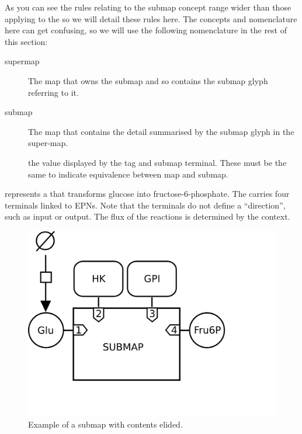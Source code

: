 As you can see the rules relating to the submap concept range wider
than those applying to the  so we will detail
these rules here. The concepts and nomenclature here can get confusing, so we will use
 the following nomenclature in the rest of this section:
\begin{description}
\item[supermap] The map that owns the submap and so contains the submap glyph referring to it.
\item[submap] The map that contains the detail summarised by the submap glyph in the super-map.
\item[] the value displayed by the tag and
  submap terminal. These must be the same to indicate equivalence
  between map and submap.
\end{description}

 represents a  that transforms
glucose into fructose-6-phosphate.
The  carries four terminals linked to EPNs.
Note that the terminals do not define a ``direction'', such as input or
output.  The flux of the reactions is determined by the context.

\begin{figure}[htb]
  \centering
  \includegraphics[scale = 0.4]{examples/submap-folded}
  \caption{Example of a submap with contents elided.}
  \label{fig:techref:submap-folded}
\end{figure}

